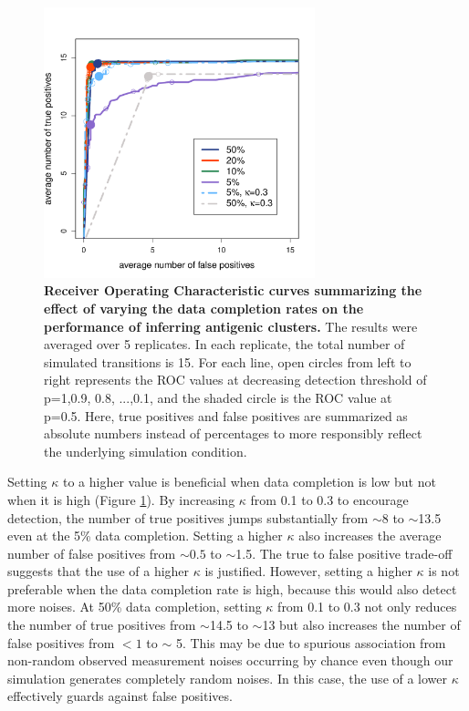 \documentclass[11pt,oneside,letterpaper]{article}
\begin{document}
\begin{figure}[h]
	\centering		
	\includegraphics[width=0.7\textwidth]{figures/custom/avgTrueVsFalsePositives-completionRate-10replicates}
	\caption{\textbf{Receiver Operating Characteristic curves summarizing the effect of varying the data completion rates on the performance of inferring antigenic clusters.} 
 The results were averaged over 5 replicates.	
 In each replicate, the total number of simulated transitions is 15.
For each line, open circles from left to right represents the ROC values at decreasing detection threshold of p=1,0.9, 0.8, ...,0.1, and the shaded circle is the ROC value at p=0.5.
Here, true positives and false positives are summarized as absolute numbers instead of percentages to more responsibly reflect the underlying simulation condition.
	 		} 
	
	\label{ROCSimulation} 
\end{figure}






Setting $\kappa$ to a higher value is beneficial when data completion is low but not when it is high (Figure \ref{ROCSimulation}). 
By increasing $\kappa$ from 0.1 to 0.3 to encourage detection, the number of true positives jumps substantially from $\sim8$ to $\sim$13.5 even at the 5\% data completion. 
Setting a higher $\kappa$ also increases the average number of false positives from $\sim0.5$ to $\sim$1.5. 
The true to false positive trade-off suggests that the use of a higher $\kappa$ is justified. 
However, setting a higher $\kappa$ is not preferable when the data completion rate is high, because this would also detect more noises. 
At 50\% data completion, setting $\kappa$ from 0.1 to 0.3 not only reduces the number of true positives from $\sim$14.5 to $\sim$13 but also increases the number of false positives from $<1$ to $\sim$ 5. 
This may be due to  spurious association from non-random observed measurement noises occurring by chance even though our simulation generates completely random noises. 
In this case, the use of a lower $\kappa$ effectively guards against false positives.







\newpage




\end{document}
